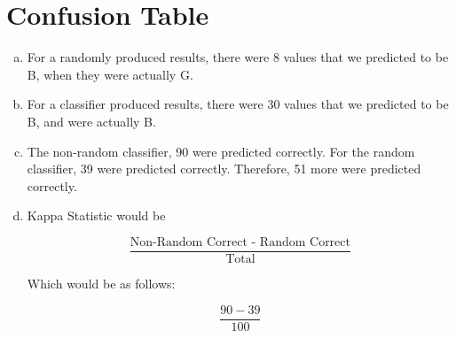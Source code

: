 \documentclass[12pt]{scrartcl}
\begin{document}
\section{Confusion Table}
\begin{enumerate}[(a)]
    \item For a randomly produced results, there were 8 values that we predicted to be B, when they were actually G.
    \item For a classifier produced results, there were 30 values that we predicted to be B, and were actually B.
    \item The non-random classifier, 90 were predicted correctly. For the random classifier, 39 were predicted correctly. Therefore, 51 more were predicted correctly.
    \item Kappa Statistic would be

        \begin{equation*}
            \frac{
                \text{Non-Random Correct - Random Correct}
            }{
                \text{Total}
            }
        \end{equation*}

        Which would be as follows:

        \begin{equation*}
            \frac{90 - 39}{100}
        \end{equation*}
\end{enumerate}
\end{document}
